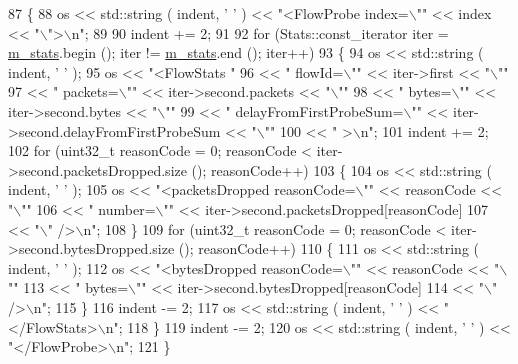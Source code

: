 \begin{DoxyCode}
87 \{
88   os << std::string ( indent, \textcolor{charliteral}{' '} ) << \textcolor{stringliteral}{"<FlowProbe index=\(\backslash\)""} << index << \textcolor{stringliteral}{"\(\backslash\)">\(\backslash\)n"};
89 
90   indent += 2;
91 
92   \textcolor{keywordflow}{for} (Stats::const\_iterator iter = \hyperlink{classns3_1_1FlowProbe_a33e073a315870591d4c8e9a1001b2a8b}{m\_stats}.begin (); iter != \hyperlink{classns3_1_1FlowProbe_a33e073a315870591d4c8e9a1001b2a8b}{m\_stats}.end (); iter++)
93     \{
94       os << std::string ( indent, \textcolor{charliteral}{' '} );
95       os << \textcolor{stringliteral}{"<FlowStats "}
96          << \textcolor{stringliteral}{" flowId=\(\backslash\)""} << iter->first << \textcolor{stringliteral}{"\(\backslash\)""}
97          << \textcolor{stringliteral}{" packets=\(\backslash\)""} << iter->second.packets << \textcolor{stringliteral}{"\(\backslash\)""}
98          << \textcolor{stringliteral}{" bytes=\(\backslash\)""} << iter->second.bytes << \textcolor{stringliteral}{"\(\backslash\)""}
99          << \textcolor{stringliteral}{" delayFromFirstProbeSum=\(\backslash\)""} << iter->second.delayFromFirstProbeSum << \textcolor{stringliteral}{"\(\backslash\)""}
100          << \textcolor{stringliteral}{" >\(\backslash\)n"};
101       indent += 2;
102       \textcolor{keywordflow}{for} (uint32\_t reasonCode = 0; reasonCode < iter->second.packetsDropped.size (); reasonCode++)
103         \{
104           os << std::string ( indent, \textcolor{charliteral}{' '} );
105           os << \textcolor{stringliteral}{"<packetsDropped reasonCode=\(\backslash\)""} << reasonCode << \textcolor{stringliteral}{"\(\backslash\)""}
106              << \textcolor{stringliteral}{" number=\(\backslash\)""} << iter->second.packetsDropped[reasonCode]
107              << \textcolor{stringliteral}{"\(\backslash\)" />\(\backslash\)n"};
108         \}
109       \textcolor{keywordflow}{for} (uint32\_t reasonCode = 0; reasonCode < iter->second.bytesDropped.size (); reasonCode++)
110         \{
111           os << std::string ( indent, \textcolor{charliteral}{' '} );
112           os << \textcolor{stringliteral}{"<bytesDropped reasonCode=\(\backslash\)""} << reasonCode << \textcolor{stringliteral}{"\(\backslash\)""}
113              << \textcolor{stringliteral}{" bytes=\(\backslash\)""} << iter->second.bytesDropped[reasonCode]
114              << \textcolor{stringliteral}{"\(\backslash\)" />\(\backslash\)n"};
115         \}
116       indent -= 2;
117       os << std::string ( indent, \textcolor{charliteral}{' '} ) << \textcolor{stringliteral}{"</FlowStats>\(\backslash\)n"};
118     \}
119   indent -= 2;
120   os << std::string ( indent, \textcolor{charliteral}{' '} ) << \textcolor{stringliteral}{"</FlowProbe>\(\backslash\)n"};
121 \}
\end{DoxyCode}


